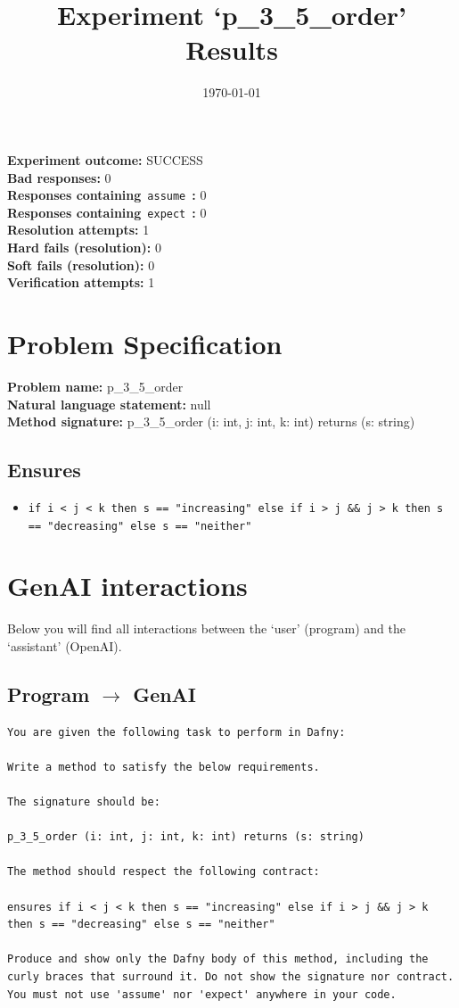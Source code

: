 \documentclass{article}
\begin{document}
\title{Experiment `p\_3\_5\_order' Results}
\author{\today}
\date{}
\maketitle
\textbf{Experiment outcome: }SUCCESS
\\\textbf{Bad responses: }0
\\\textbf{Responses containing}~\texttt{assume}~\textbf{: }0
\\\textbf{Responses containing}~\texttt{expect}~\textbf{: }0
\\\textbf{Resolution attempts: }1
\\\textbf{Hard fails (resolution): }0
\\\textbf{Soft fails (resolution): }0
\\\textbf{Verification attempts: }1
\section*{Problem Specification}
\textbf{Problem name: }p\_3\_5\_order
\\\textbf{Natural language statement: }null
\\\textbf{Method signature: }p\_3\_5\_order (i: int, j: int, k: int) returns (s: string)
\subsection*{Ensures}
\begin{itemize}
\item \texttt{if i < j < k then s == "increasing" else if i > j \&\& j > k then s == "decreasing" else s == "neither"}
\end{itemize}
\clearpage
\section*{GenAI interactions}
Below you will find all interactions between the `user' (program) and the `assistant' (OpenAI).
\subsection*{Program $\rightarrow$ GenAI}
\begin{lstlisting}
You are given the following task to perform in Dafny:

Write a method to satisfy the below requirements.

The signature should be:

p_3_5_order (i: int, j: int, k: int) returns (s: string)

The method should respect the following contract:

ensures if i < j < k then s == "increasing" else if i > j && j > k then s == "decreasing" else s == "neither"

Produce and show only the Dafny body of this method, including the curly braces that surround it. Do not show the signature nor contract. You must not use 'assume' nor 'expect' anywhere in your code.
\end{lstlisting}
\end{document}
